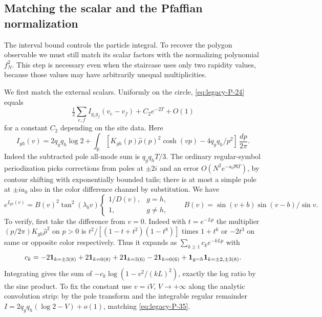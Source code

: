 \subsection{Matching the scalar and the Pfaffian normalization}
\label{u:marked-denominator}

The interval bound controls the particle integral.  To recover the
polygon observable we must still match its scalar factors with the
normalizing polynomial $f_N^2$.  This step is necessary even when the
staircase uses only two rapidity values, because those values may have
arbitrarily unequal multiplicities.

We first match the external scalars. Uniformly on the circle, \eqref{eq:legacy-P-24} equals
\[
 \tfrac12\sum_{e,f} I_{g_e g_f}(v_e-v_f)+C_2 e^{-2T}+O(1)
\]
for a constant \(C_2\) depending on the site data. Here
\[
 I_{gh}(v)=2 q_g q_h\log2+\int_{\mathbb R}\!
 [K_{gh}(p)\widehat\rho(p)^2\cosh(vp)-4q_g q_h/p^2]\,\frac{dp}{2\pi}.
\]
Indeed the subtracted pole all-mode sum is \(q_g q_h T/3\). The ordinary regular-symbol periodization picks corrections from poles at \(\pm2i\) and an error \(O(N^2 e^{-a_0 \Re T})\), by contour shifting with exponentially bounded tails; there is at most a simple pole at \(\pm i a_0\) also in the color difference channel by substitution. We have
\begin{equation}
 e^{I_{gh}(v)}= B(v)^2\tan^2(\lambda_b v)
 \begin{cases}1/D(v),&g=h,\\ 1,&g\ne h,\end{cases}
 \qquad B(v)=\sin(v+b)\sin(v-b)/\sin v .
 \label{eq:legacy-P-35}
\end{equation}
To verify, first take the difference from \(v=0\). Indeed with \(t=e^{-Lp}\) the multiplier \((p/2\pi)K_{gh}\widehat\rho^2\) on \(p>0\) is \(t^2/[(1-t+t^2)(1-t^8)]\) times \(1+t^6\) or \(-2t^3\) on same or opposite color respectively. Thus it expands as \(\sum_{k\ge1} c_k e^{-kLp}\) with
\[
 c_k=-2{\bf1}_{k=\pm3(8)}+2{\bf1}_{k=0(8)}+2{\bf1}_{k=3(6)}-2{\bf1}_{k=0(6)}
 +{\bf1}_{g=h}{\bf1}_{k=\pm2,\pm3(8)} .
\]
Integrating gives the sum of \(-c_k\log(1-v^2/(kL)^2)\), exactly the log ratio by the sine product. To fix the constant use \(v=i V\), \(V\to+\infty\) along the analytic convolution strip: by the pole transform and the integrable regular remainder \(I=2q_gq_h(\log2-V)+o(1)\), matching \eqref{eq:legacy-P-35}.



